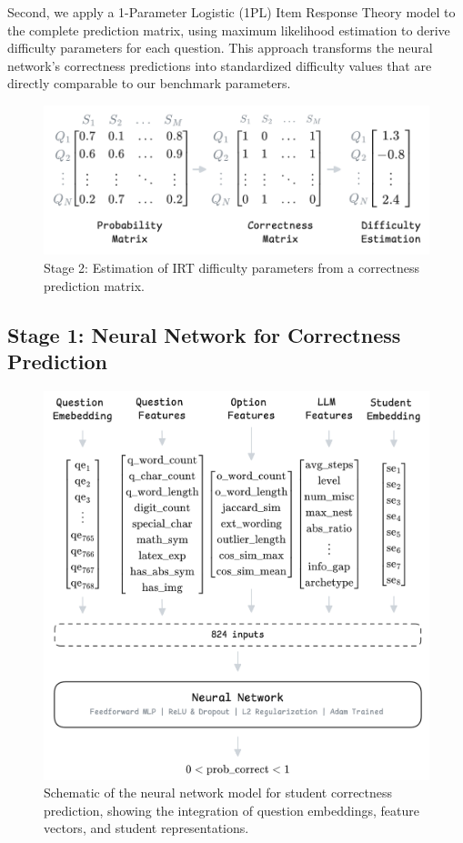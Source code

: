 \documentclass[
    a4paper, %
    10pt, %
    twoside, %
]{LTJournalArticle}
\begin{document}
Second, we apply a 1-Parameter Logistic (1PL) Item Response Theory model to the complete prediction matrix, using maximum likelihood estimation to derive difficulty parameters for each question. This approach transforms the neural network's correctness predictions into standardized difficulty values that are directly comparable to our benchmark parameters.

\begin{figure}[H]
    \centering
    \includegraphics[width=0.8\columnwidth]{figures/stage2.png}
    \caption{Stage 2: Estimation of IRT difficulty parameters from a correctness prediction matrix.}
    \label{fig:stage2}
\end{figure}


\subsection{Stage 1: Neural Network for Correctness Prediction}

\begin{figure}[H]
    \centering
    \includegraphics[width=0.9\columnwidth]{figures/stage1-detailed.png}
    \caption{Schematic of the neural network model for student correctness prediction, showing the integration of question embeddings, feature vectors, and student representations.}
    \label{fig:stage1-detailed}
\end{figure}
\end{document}
